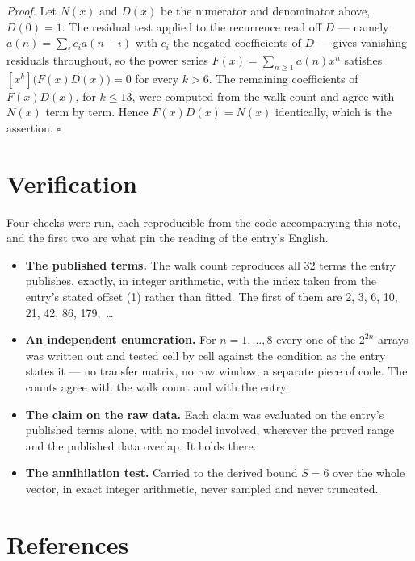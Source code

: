 \documentclass[11pt]{article}
\theoremstyle{definition}
\begin{document}
{\itshape Proof.} Let $N(x)$ and $D(x)$ be the numerator and denominator above, $D(0)=1$. The residual test applied to the recurrence read off $D$ --- namely $a(n) = \sum_i c_i a(n-i)$ with $c_i$ the negated coefficients of $D$ --- gives vanishing residuals throughout, so the power series $F(x)=\sum_{n\ge 1}a(n)x^n$ satisfies $[x^k]\bigl(F(x)D(x)\bigr) = 0$ for every $k > 6$. The remaining coefficients of $F(x)D(x)$, for $k \le 13$, were computed from the walk count and agree with $N(x)$ term by term. Hence $F(x)D(x) = N(x)$ identically, which is the assertion. $\square$

\section{Verification}

Four checks were run, each reproducible from the code accompanying this note, and the first two are what pin the reading of the entry's English.

\begin{itemize}

\item {\bfseries The published terms.} The walk count reproduces all 32 terms the entry publishes, exactly, in integer arithmetic, with the index taken from the entry's stated offset (1) rather than fitted. The first of them are 2, 3, 6, 10, 21, 42, 86, 179,~\dots

\item {\bfseries An independent enumeration.} For $n = 1,\dots,8$ every one of the $2^{2n}$ arrays was written out and tested cell by cell against the condition as the entry states it --- no transfer matrix, no row window, a separate piece of code. The counts agree with the walk count and with the entry.

\item {\bfseries The claim on the raw data.} Each claim was evaluated on the entry's published terms alone, with no model involved, wherever the proved range and the published data overlap. It holds there.

\item {\bfseries The annihilation test.} Carried to the derived bound $S = 6$ over the whole vector, in exact integer arithmetic, never sampled and never truncated.

\end{itemize}

\section{References}
\end{document}
